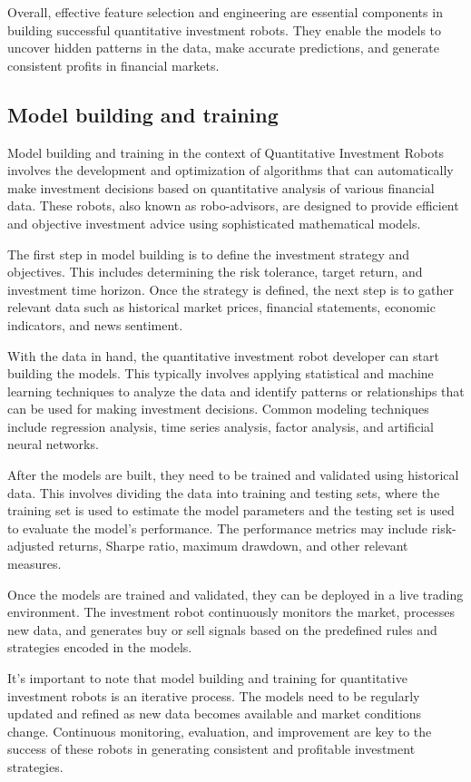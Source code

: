 \documentclass[UTF8]{ctexart}
\begin{document}
Overall, effective feature selection and engineering are essential components in building successful quantitative investment robots. They enable the models to uncover hidden patterns in the data, make accurate predictions, and generate consistent profits in financial markets.

\subsection{Model building and training}
Model building and training in the context of Quantitative Investment Robots involves the development and optimization of algorithms that can automatically make investment decisions based on quantitative analysis of various financial data. These robots, also known as robo-advisors, are designed to provide efficient and objective investment advice using sophisticated mathematical models.

The first step in model building is to define the investment strategy and objectives. This includes determining the risk tolerance, target return, and investment time horizon. Once the strategy is defined, the next step is to gather relevant data such as historical market prices, financial statements, economic indicators, and news sentiment.

With the data in hand, the quantitative investment robot developer can start building the models. This typically involves applying statistical and machine learning techniques to analyze the data and identify patterns or relationships that can be used for making investment decisions. Common modeling techniques include regression analysis, time series analysis, factor analysis, and artificial neural networks.

After the models are built, they need to be trained and validated using historical data. This involves dividing the data into training and testing sets, where the training set is used to estimate the model parameters and the testing set is used to evaluate the model's performance. The performance metrics may include risk-adjusted returns, Sharpe ratio, maximum drawdown, and other relevant measures.

Once the models are trained and validated, they can be deployed in a live trading environment. The investment robot continuously monitors the market, processes new data, and generates buy or sell signals based on the predefined rules and strategies encoded in the models.

It's important to note that model building and training for quantitative investment robots is an iterative process. The models need to be regularly updated and refined as new data becomes available and market conditions change. Continuous monitoring, evaluation, and improvement are key to the success of these robots in generating consistent and profitable investment strategies.
\end{document}
